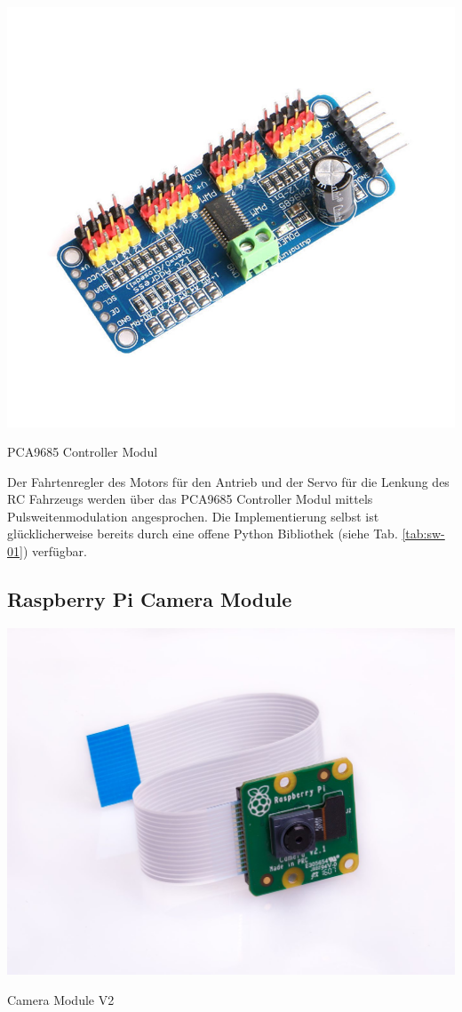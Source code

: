     \begin{minipage}{\columnwidth}
      \makeatletter
      \def\@captype{figure}
      \makeatother
      \centering
      \includegraphics[width=0.6\linewidth]{images/hw_pca9685.jpg}
      \caption{PCA9685 Controller Modul}
      \label{fig:img-hw-02}
    \end{minipage}
    \vspace{1cm}

    \noindent
    Der Fahrtenregler des Motors für den Antrieb und der Servo für die Lenkung
    des RC Fahrzeugs werden über das PCA9685 Controller Modul mittels
    Pulsweitenmodulation angesprochen. Die Implementierung selbst ist
    glücklicherweise bereits durch eine offene Python Bibliothek (siehe Tab.
    \ref{tab:sw-01}) verfügbar. 
  
  \subsection{Raspberry Pi Camera Module}
    \begin{minipage}{\columnwidth}
      \makeatletter
      \def\@captype{figure}
      \makeatother
      \centering
      \includegraphics[width=0.6\linewidth]{images/hw_picam.jpg}
      \caption{Camera Module V2}
      \label{fig:img-hw-03}
    \end{minipage}
    \vspace{1cm}

